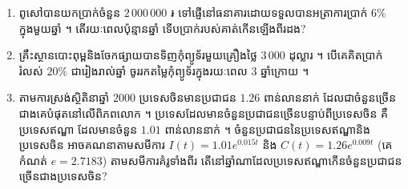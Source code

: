 \begin{pro}
\begin{enumerate}[a]
  \item ពូសៅបានយកប្រាក់ចំនួន $2\,000\,000$ ៛ ទៅផ្ញើនៅធនាគារដោយទទួលបានអត្រាការប្រាក់ $6\%$ ក្នុងមួយឆ្នាំ ។ តើរយៈពេលប៉ុន្មានឆ្នាំ ទើបប្រាក់របស់គាត់កើនឡើងពីរដង?
  \item គ្រឹះស្ថានបោះពុម្ពនិងចែកផ្សាយបានទិញកុំព្យូទ័រមួយគ្រឿងថ្លៃ $3\,000$ ដុល្លារ ។ បើគេគិតប្រាក់រំលស់ $20\%$ ជារៀងរាល់ឆ្នាំ ចូររកតម្លៃកុំព្យូទ័រក្នុងរយៈពេល $3$ ឆ្នាំក្រោយ ។
  \item តាមការស្រង់ស្ថិតិនាឆ្នាំ $2000$ ប្រទេសចិនមានប្រជាជន $1.26$ ពាន់លាននាក់ ដែលជាចំនួនច្រើនជាងគេបំផុតនៅលើពិភពលោក ។ ប្រទេសដែលមានចំនួនប្រជាជនច្រើនបន្ទាប់ពីប្រទេសចិន គឺប្រទេសឥណ្ឌា ដែលមានចំនួន $1.01$ ពាន់លាននាក់ ។ ចំនួនប្រជាជននៃប្រទេសឥណ្ឌានិងប្រទេសចិន អាចគណនាតាមសមីការ $I(t) = 1.01e^{0.015t}$ និង $C(t) = 1.26e^{0.009t}$ (គេកំណត់ $e = 2.7183$) តាមសមីការគំរូទាំងពីរ តើនៅឆ្នាំណាដែលប្រទេសឥណ្ឌាកើនចំនួនប្រជាជនច្រើនជាងប្រទេសចិន?
\end{enumerate}
\end{pro}

